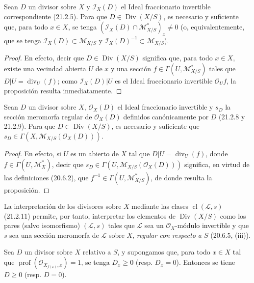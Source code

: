 \begin{proposition}[21.15.4]
\label{IV.21.15.4}
Sean $D$ un divisor sobre $X$ y $\mathscr I_X(D)$ el Ideal fraccionario invertible
correspondiente \textup{(21.2.5)}. Para que $D\in\operatorname{Div}(X/S)$, es necesario y suficiente
que, para todo $x\in X$, se tenga
$(\mathscr I_X(D)\cap\mathscr M_{X/S}^*)_x\ne0$ \textup{(}o, equivalentemente, que
se tenga $\mathscr I_X(D)\subset\mathscr M_{X/S}$ y
$\mathscr I_X(D)^{-1}\subset\mathscr M_{X/S}$\textup{)}.
\end{proposition}

\begin{proof}
En efecto, decir que $D\in\operatorname{Div}(X/S)$ significa que, para todo $x\in X$,
existe una vecindad abierta $U$ de $x$ y una sección
$f\in\Gamma(U,\mathscr M_{X/S}^*)$ tales que $D|U=\operatorname{div}_U(f)$; como
$\mathscr I_X(D)|U$ es el Ideal fraccionario invertible $\mathcal O_Uf$, la
proposición resulta inmediatamente.
\end{proof}

\begin{proposition}[21.15.5]
\label{IV.21.15.5}
Sean $D$ un divisor sobre $X$, $\mathcal O_X(D)$ el Ideal fraccionario invertible y
$s_D$ la sección meromorfa regular de $\mathcal O_X(D)$ definidos canónicamente por
$D$ \textup{(21.2.8 y 21.2.9)}. Para que $D\in\operatorname{Div}(X/S)$, es necesario y suficiente
que $s_D\in\Gamma(X,\mathscr M_{X/S}(\mathcal O_X(D)))$.
\end{proposition}

\begin{proof}
En efecto, si $U$ es un abierto de $X$ tal que $D|U=\operatorname{div}_U(f)$, donde
$f\in\Gamma(U,\mathscr M_X^*)$, decir que
$s_D\in\Gamma(U,\mathscr M_{X/S}(\mathcal O_X(D)))$ significa, en virtud de las
definiciones (20.6.2), que $f^{-1}\in\Gamma(U,\mathscr M_{X/S}^*)$, de donde resulta la
proposición.
\end{proof}

La interpretación de los divisores sobre $X$ mediante las clases
$\operatorname{cl}(\mathscr L,s)$ (21.2.11) permite, por tanto, interpretar los elementos de
$\operatorname{Div}(X/S)$ como los pares (salvo isomorfismo) $(\mathscr L,s)$
tales que $\mathscr L$ sea un $\mathcal O_X$-módulo invertible y que $s$ sea una
sección meromorfa de $\mathscr L$ sobre $X$, \emph{regular con respecto a
$S$} (20.6.5, (iii)).

\begin{proposition}[21.15.6]
\label{IV.21.15.6}
Sea $D$ un divisor sobre $X$ relativo a $S$, y supongamos que, para todo $x\in X$ tal
que $\operatorname{prof}(\mathcal O_{X_{f(x)},x})=1$, se tenga $D_x\geq0$
\textup{(resp. $D_x=0$)}. Entonces se tiene $D\geq0$ \textup{(resp. $D=0$)}.
\end{proposition}

